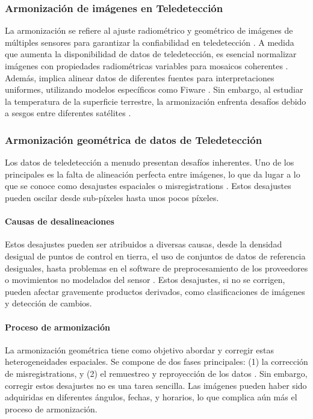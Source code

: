            \subsubsection{Armonización de imágenes en Teledetección}
                La armonización se refiere al ajuste radiométrico y geométrico de imágenes de múltiples sensores para garantizar la confiabilidad en teledetección \autocite{ichikawa2022development}. A medida que aumenta la disponibilidad de datos de teledetección, es esencial normalizar imágenes con propiedades radiométricas variables para mosaicos coherentes \autocite{langheinrich2017enhanced}. Además, implica alinear datos de diferentes fuentes para interpretaciones uniformes, utilizando modelos específicos como Fiware \autocite{vosinakis2022data}. Sin embargo, al estudiar la temperatura de la superficie terrestre, la armonización enfrenta desafíos debido a sesgos entre diferentes satélites \autocite{adeniran2022cross}.
                
            \subsubsection{Armonización geométrica de datos de Teledetección}
                Los datos de teledetección a menudo presentan desafíos inherentes. Uno de los principales es la falta de alineación perfecta entre imágenes, lo que da lugar a lo que se conoce como desajustes espaciales o misregistrations \autocite{storey2016note, wolfe2002achieving, yan2018sentinel}. Estos desajustes pueden oscilar desde sub-píxeles hasta unos pocos píxeles.
                
                \paragraph{Causas de desalineaciones}
                    Estos desajustes pueden ser atribuidos a diversas causas, desde la densidad desigual de puntos de control en tierra, el uso de conjuntos de datos de referencia desiguales, hasta problemas en el software de preprocesamiento de los proveedores o movimientos no modelados del sensor \autocite{storey2016note}. Estos desajustes, si no se corrigen, pueden afectar gravemente productos derivados, como clasificaciones de imágenes y detección de cambios.
                    
                \paragraph{Proceso de armonización}
                    La armonización geométrica tiene como objetivo abordar y corregir estas heterogeneidades espaciales. Se compone de dos fases principales: (1) la corrección de misregistrations, y (2) el remuestreo y reproyección de los datos \autocite{roy2000impact}. Sin embargo, corregir estos desajustes no es una tarea sencilla. Las imágenes pueden haber sido adquiridas en diferentes ángulos, fechas, y horarios, lo que complica aún más el proceso de armonización.
                    
